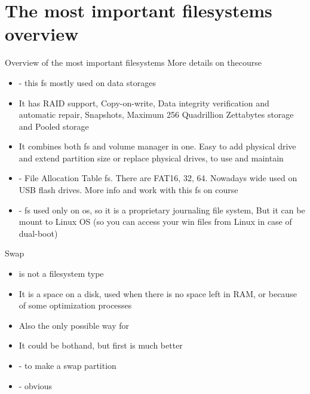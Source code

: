 \documentclass[usenames,dvipsnames,10pt,aspectratio=169]{beamer}
\begin{document}
\section{The most important filesystems overview}
\begin{frame}{Overview of the most important filesystems}
    More details on thecourse
    \begin{itemize}
        \item {} - this fs mostly used on data storages
        \item It has RAID support, Copy-on-write, Data integrity verification and automatic repair, Snapshots, Maximum 256 Quadrillion Zettabytes storage and Pooled storage
        \item It combines both fs and volume manager in one. Easy to add physical drive and extend partition size or replace physical drives, to use and maintain
        \item {} - File Allocation Table fs. There are FAT16, 32, 64. Nowadays wide used on USB flash drives. More info and work with this fs on  course
        \item {} - fs used only on  os, so it is a proprietary journaling file system, But it can be mount to Linux OS (so you can access your win files from Linux in case of dual-boot)
    \end{itemize}
\end{frame}

\begin{frame}{Swap}
    \begin{itemize}
        \item {} is not a filesystem type
        \item It is a space on a disk, used when there is no space left in RAM, or because of some optimization processes
        \item Also the only possible way for
        \item It could be bothand, but first is much better
        \item {} - to make a swap partition
        \item {} - obvious
    \end{itemize}
\end{frame}
\end{document}
